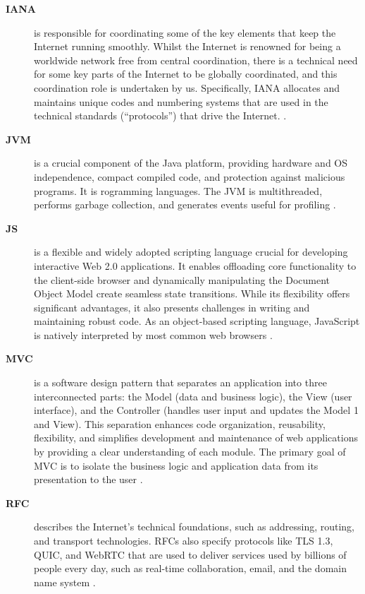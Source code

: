 \begin{description}
\item[\textbf{IANA}] is responsible for coordinating some of the key elements that keep the Internet running smoothly. Whilst the Internet is renowned for being a worldwide network free from central coordination, there is a technical need for some key parts of the Internet to be globally coordinated, and this coordination role is undertaken by us.
Specifically, IANA allocates and maintains unique codes and numbering systems that are used in the technical standards (“protocols”) that drive the Internet. \cite{iana_about}.

\item[\textbf{JVM}]  is a crucial component of the Java platform, providing hardware and OS independence, compact compiled code, and protection against malicious programs. It is rogramming languages. The JVM is multithreaded, performs garbage collection, and generates events useful for profiling \cite{lindholm2014java, viswanathan2000java}.

\item[\textbf{JS}] is a flexible and widely adopted scripting language crucial for developing interactive Web 2.0 applications. It enables offloading core functionality to the client-side browser and dynamically manipulating the Document Object Model create seamless state transitions. While its flexibility offers significant advantages, it also presents challenges in writing and maintaining robust code. As an object-based scripting language, JavaScript is natively interpreted by most common web browsers \cite{fard2013jsnose, stothard2000sequence}.

\item[\textbf{MVC}] is a software design pattern that separates an application into three interconnected parts: the Model (data and business logic), the View (user interface), and the Controller (handles user input and updates the Model 1  and View). This separation enhances code organization, reusability, flexibility, and simplifies development and maintenance of web applications by providing a clear understanding of each module. The primary goal of MVC is to isolate the business logic and application data from its presentation to the user \cite{jivani2013over, singh2016comparative, thakur2019role, thakur2019study}.

\item[\textbf{RFC}] describes the Internet's technical foundations, such as addressing, routing, and transport technologies. RFCs also specify protocols like TLS 1.3, QUIC, and WebRTC that are used to deliver services used by billions of people every day, such as real-time collaboration, email, and the domain name system \cite{ietf_rfc_website}.


\end{description}
